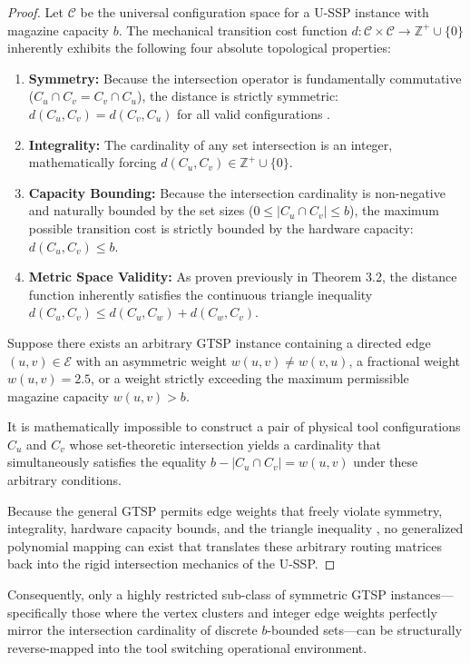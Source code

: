 \documentclass[11pt, a4paper]{book}
\begin{document}
	\begin{proof}
		Let $\mathcal{C}$ be the universal configuration space for a U-SSP instance with magazine capacity $b$. The mechanical transition cost function $d: \mathcal{C} \times \mathcal{C} \to \mathbb{Z}^+ \cup \{0\}$ inherently exhibits the following four absolute topological properties:
		\begin{enumerate}
			\item \textbf{Symmetry:} Because the intersection operator is fundamentally commutative ($C_u \cap C_v = C_v \cap C_u$), the distance is strictly symmetric: $d(C_u, C_v) = d(C_v, C_u)$ for all valid configurations %
			.
			\item \textbf{Integrality:} The cardinality of any set intersection is an integer, mathematically forcing $d(C_u, C_v) \in \mathbb{Z}^+ \cup \{0\}$.
			\item \textbf{Capacity Bounding:} Because the intersection cardinality is non-negative and naturally bounded by the set sizes ($0 \le |C_u \cap C_v| \le b$), the maximum possible transition cost is strictly bounded by the hardware capacity: $d(C_u, C_v) \le b$.
			\item \textbf{Metric Space Validity:} As proven previously in Theorem 3.2, the distance function inherently satisfies the continuous triangle inequality $d(C_u, C_v) \le d(C_u, C_w) + d(C_w, C_v)$.
		\end{enumerate}
		
		Suppose there exists an arbitrary GTSP instance containing a directed edge $(u, v) \in \mathcal{E}$ with an asymmetric weight $w(u,v) \neq w(v,u)$, a fractional weight $w(u,v) = 2.5$, or a weight strictly exceeding the maximum permissible magazine capacity $w(u,v) > b$. 
		
		It is mathematically impossible to construct a pair of physical tool configurations $C_u$ and $C_v$ whose set-theoretic intersection yields a cardinality that simultaneously satisfies the equality $b - |C_u \cap C_v| = w(u,v)$ under these arbitrary conditions. 
		
		Because the general GTSP permits edge weights that freely violate symmetry, integrality, hardware capacity bounds, and the triangle inequality %
		, no generalized polynomial mapping can exist that translates these arbitrary routing matrices back into the rigid intersection mechanics of the U-SSP.
	\end{proof}
	
	Consequently, only a highly restricted sub-class of symmetric GTSP instances—specifically those where the vertex clusters and integer edge weights perfectly mirror the intersection cardinality of discrete $b$-bounded sets—can be structurally reverse-mapped into the tool switching operational environment. 
	
\end{document}
